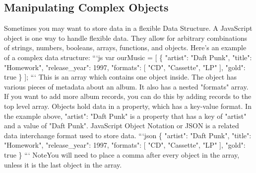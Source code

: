 \documentclass{article}%
\begin{document}
%
\subsection{Manipulating Complex Objects}%
\label{subsec:ManipulatingComplexObjects}%
Sometimes you may want to store data in a flexible Data Structure. A JavaScript object is one way to handle flexible data. They allow for arbitrary combinations of strings, numbers, booleans, arrays, functions, and objects.\newline%
Here's an example of a complex data structure:\newline%
```js\newline%
var ourMusic = {[}\newline%
  \{\newline%
    "artist": "Daft Punk",\newline%
    "title": "Homework",\newline%
    "release\_year": 1997,\newline%
    "formats": {[} \newline%
      "CD", \newline%
      "Cassette", \newline%
      "LP"\newline%
    {]},\newline%
    "gold": true\newline%
  \}\newline%
{]};\newline%
```\newline%
This is an array which contains one object inside. The object has various pieces of metadata about an album. It also has a nested "formats" array. If you want to add more album records, you can do this by adding records to the top level array.\newline%
Objects hold data in a property, which has a key{-}value format. In the example above, "artist": "Daft Punk" is a property that has a key of "artist" and a value of "Daft Punk".\newline%
JavaScript Object Notation or JSON is a related data interchange format used to store data.\newline%
```json\newline%
\{\newline%
  "artist": "Daft Punk",\newline%
  "title": "Homework",\newline%
  "release\_year": 1997,\newline%
  "formats": {[} \newline%
    "CD",\newline%
    "Cassette",\newline%
    "LP"\newline%
  {]},\newline%
  "gold": true\newline%
\}\newline%
```\newline%
NoteYou will need to place a comma after every object in the array, unless it is the last object in the array.\newline%
\end{document}
